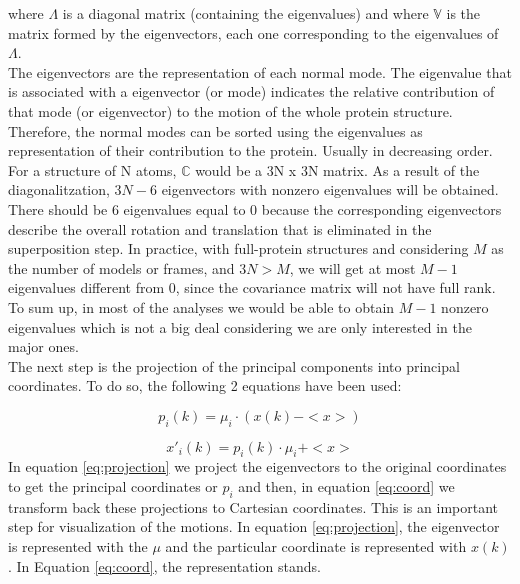 \documentclass[12pt]{article}
\begin{document}
where $\Lambda$ is a diagonal matrix (containing the eigenvalues) and where $\mathbb{V}$ is the matrix formed by the eigenvectors, each one corresponding to the eigenvalues of $\Lambda$.\\

The eigenvectors are the representation of each normal mode. The eigenvalue that is associated with a eigenvector (or mode) indicates the relative contribution of that mode (or eigenvector) to the motion of the whole protein structure.\citep{Gargallo2003}\\

Therefore, the normal modes can be sorted using the eigenvalues as representation of their contribution to the protein. Usually in decreasing order. For a structure of N atoms, $\mathbb{C}$ would be a 3N x 3N matrix. As a result of the diagonalitzation, $3N − 6$ eigenvectors with nonzero eigenvalues will be obtained. There should be 6 eigenvalues equal to 0 because the corresponding eigenvectors describe the overall rotation and translation that is eliminated in the superposition step. In practice, with full-protein structures and considering $M$ as the number of models or frames, and $3N > M$, we will get at most $M-1$ eigenvalues different from $0$, since the covariance matrix will not have full rank. To sum up, in most of the analyses we would be able to obtain $M-1$ nonzero eigenvalues which is not a big deal considering we are only interested in the major ones\citep{Hayward2008}.\\ 

The next step is the projection of the principal components into principal coordinates. To do so, the following 2 equations have been used:

\begin{equation}
p_{i}(k)=\mu_{i}\cdot (x(k) - <x>) 
\label{eq:projection}
\end{equation}

\begin{equation}
x'_{i}(k)=p_{i}(k) \cdot \mu_{i} + <x>
\label{eq:coord}
\end{equation}
In equation \eqref{eq:projection} we project the eigenvectors to the original coordinates to get the principal coordinates or $p_{i}$ and then, in equation \eqref{eq:coord} we transform back these projections to Cartesian coordinates. This is an important step for visualization of the motions. In equation \eqref{eq:projection}, the eigenvector is represented with the $\mu$ and the particular coordinate is represented with $x(k)$. In Equation \eqref{eq:coord}, the representation stands.\citep{Hayward2008}
\clearpage
\end{document}
